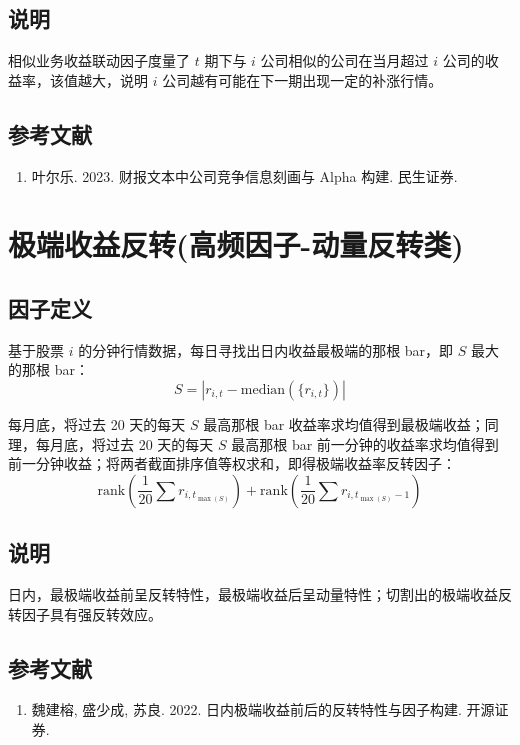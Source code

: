 \documentclass{article}
\begin{document}
\subsection{说明}
相似业务收益联动因子度量了 \( t \) 期下与 \( i \) 公司相似的公司在当月超过 \( i \) 公司的收益率，该值越大，说明 \( i \) 公司越有可能在下一期出现一定的补涨行情。

\subsection{参考文献}
\begin{enumerate}
    \item 叶尔乐. 2023. 财报文本中公司竞争信息刻画与 Alpha 构建. 民生证券.
\end{enumerate}

\section{极端收益反转(高频因子-动量反转类)}

\subsection{因子定义}

基于股票 \( i \) 的分钟行情数据，每日寻找出日内收益最极端的那根 bar，即 \( S \) 最大的那根 bar：
\begin{equation}
    S = |r_{i,t} - \mathrm{median}(\{r_{i,t}\})|
\end{equation}

每月底，将过去 20 天的每天 \( S \) 最高那根 bar 收益率求均值得到最极端收益；同理，每月底，将过去 20 天的每天 \( S \) 最高那根 bar 前一分钟的收益率求均值得到前一分钟收益；将两者截面排序值等权求和，即得极端收益率反转因子：
\begin{equation}
    \mathrm{rank}\left(\frac{1}{20} \sum r_{i,t_{\max(S)}}\right) + \mathrm{rank}\left(\frac{1}{20} \sum r_{i,t_{\max(S)}-1}\right)
\end{equation}

\subsection{说明}
日内，最极端收益前呈反转特性，最极端收益后呈动量特性；切割出的极端收益反转因子具有强反转效应。

\subsection{参考文献}
\begin{enumerate}
    \item 魏建榕, 盛少成, 苏良. 2022. 日内极端收益前后的反转特性与因子构建. 开源证券.
\end{enumerate}
\end{document}
